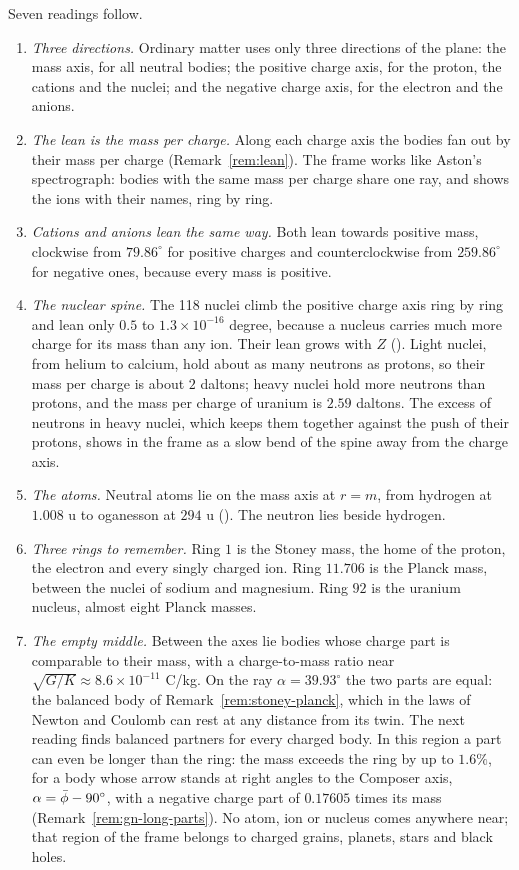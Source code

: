 Seven readings follow.
\begin{enumerate}
  \item \emph{Three directions.} Ordinary matter uses only three directions of the plane: the mass axis, for all neutral bodies; the positive charge axis, for the proton, the cations and the nuclei; and the negative charge axis, for the electron and the anions.
  \item \emph{The lean is the mass per charge.} Along each charge axis the bodies fan out by their mass per charge (Remark~\ref{rem:lean}). The frame works like Aston's spectrograph: bodies with the same mass per charge share one ray, and  shows the ions with their names, ring by ring.
  \item \emph{Cations and anions lean the same way.} Both lean towards positive mass, clockwise from $79.86^\circ$ for positive charges and counterclockwise from $259.86^\circ$ for negative ones, because every mass is positive.
  \item \emph{The nuclear spine.} The 118 nuclei climb the positive charge axis ring by ring and lean only $0.5$ to $1.3 \times 10^{-16}$ degree, because a nucleus carries much more charge for its mass than any ion. Their lean grows with $Z$ (). Light nuclei, from helium to calcium, hold about as many neutrons as protons, so their mass per charge is about $2$ daltons; heavy nuclei hold more neutrons than protons, and the mass per charge of uranium is $2.59$ daltons. The excess of neutrons in heavy nuclei, which keeps them together against the push of their protons, shows in the frame as a slow bend of the spine away from the charge axis.
  \item \emph{The atoms.} Neutral atoms lie on the mass axis at $r = m$, from hydrogen at $1.008$ u to oganesson at $294$ u (). The neutron lies beside hydrogen.
  \item \emph{Three rings to remember.} Ring $1$ is the Stoney mass, the home of the proton, the electron and every singly charged ion. Ring $11.706$ is the Planck mass, between the nuclei of sodium and magnesium. Ring $92$ is the uranium nucleus, almost eight Planck masses.
  \item \emph{The empty middle.} Between the axes lie bodies whose charge part is comparable to their mass, with a charge-to-mass ratio near $\sqrt{G/K} \approx 8.6 \times 10^{-11}$ C/kg. On the ray $\alpha = 39.93^\circ$ the two parts are equal: the balanced body of Remark~\ref{rem:stoney-planck}, which in the laws of Newton and Coulomb can rest at any distance from its twin. The next reading finds balanced partners for every charged body. In this region a part can even be longer than the ring: the mass exceeds the ring by up to $1.6\%$, for a body whose arrow stands at right angles to the Composer axis, $\alpha = \bar{\phi} - 90^\circ$, with a negative charge part of $0.17605$ times its mass (Remark~\ref{rem:gn-long-parts}). No atom, ion or nucleus comes anywhere near; that region of the frame belongs to charged grains, planets, stars and black holes.
\end{enumerate}


